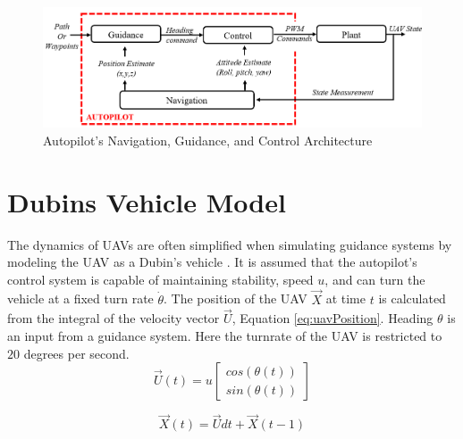 \documentclass[numbered,pdftex]{ohio-etd}
\begin{document}
%
%
%




\begin{figure}
	\centering
	\includegraphics[width=15cm]{PaperFigures/autopilotLoops2}
	\caption{Autopilot's Navigation, Guidance, and Control Architecture}
	\label{fig:autopilotloops}
\end{figure}

\section{Dubins Vehicle Model}
The dynamics of UAVs are often simplified when simulating guidance systems by modeling the UAV as a Dubin's vehicle \cite{frew_cooperative_2007,griffiths_vector_2006,nelson_cooperative_2005,nelson_vector_2006,nelson_vector_2007}. It is assumed that the autopilot's control system is capable of maintaining stability, speed $u$, and can turn the vehicle at a fixed turn rate $\dot{\theta}$. The position of the UAV $\overrightarrow{X}$ at time $t$ is calculated from the integral of the velocity vector $\overrightarrow{U}$, Equation \ref{eq:uavPosition}. Heading $\theta$ is an input from a guidance system. Here the turnrate of the UAV is restricted to $20$ degrees per second.
\begin{equation}
\label{eq:uavVelocity}
\overrightarrow{U}(t) = u \begin{bmatrix}
cos(\theta(t)) \\
sin(\theta(t))
\end{bmatrix}
\end{equation}


\begin{equation}
\label{eq:uavPosition}
\overrightarrow{X}(t) = \overrightarrow{U}dt + \overrightarrow{X}(t-1)
\end{equation}
\end{document}
